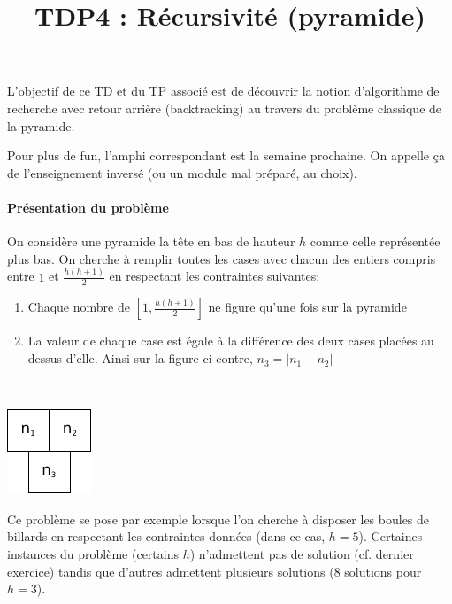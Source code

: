 \documentclass[10pt]{article}\usepackage[correction,nu]{esial}
\begin{document}
\color{black}
\title{TDP4 : Récursivité (pyramide)}
\maketitle

L'objectif de ce TD et du TP associé est de découvrir la notion d'algorithme de
recherche avec retour arrière (backtracking) au travers du problème classique de
la pyramide.

\begin{Reponse}
  Pour plus de fun, l'amphi correspondant est la semaine prochaine. On appelle
  ça de l'enseignement inversé (ou un module mal préparé, au choix).
\end{Reponse}


\paragraph{Présentation du problème}

On considère une pyramide la tête en bas de hauteur $h$ comme celle
représentée plus bas. On cherche à remplir toutes les cases avec chacun des
entiers compris entre $1$ et $\frac{h(h+1)}{2}$ en respectant les contraintes
suivantes:

\begin{minipage}{.8\linewidth}
\begin{enumerate}
\item Chaque nombre de $\left[1,\frac{h(h+1)}{2}\right]$ ne figure qu'une fois sur la pyramide
\item La valeur de chaque case est égale à la différence des deux cases placées
  au dessus d'elle.
  Ainsi sur la figure ci-contre, $n_3=|n_1 - n_2|$
\end{enumerate}  
\end{minipage}~\begin{minipage}{.2\linewidth}
  \centering
  \includegraphics{img/pyramide3.pdf} 
\end{minipage}


\noindent Ce problème se pose par exemple lorsque l'on cherche à disposer les
boules de billards en respectant les contraintes données (dans ce cas,
$h=5$). Certaines instances du problème (certains $h$) n'admettent pas de
solution (cf. dernier exercice) tandis que d'autres admettent plusieurs
solutions (8 solutions pour $h=3$).
\end{document}
